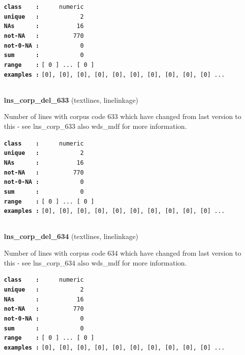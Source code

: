 \documentclass[]{article}
\begin{document}
\textbf{\texttt{class\ \ \ \ :}} \texttt{~~~~~numeric}\\
\textbf{\texttt{unique\ \ \ :}} \texttt{~~~~~~~~~~~2}\\
\textbf{\texttt{NAs\ \ \ \ \ \ :}} \texttt{~~~~~~~~~~16}\\
\textbf{\texttt{not-NA\ \ \ :}} \texttt{~~~~~~~~~770}\\
\textbf{\texttt{not-0-NA\ :}} \texttt{~~~~~~~~~~~0}\\
\textbf{\texttt{sum\ \ \ \ \ \ :}} \texttt{~~~~~~~~~~~0}\\
\textbf{\texttt{range\ \ \ \ :}}
\texttt{{[}\ 0\ {]}\ ...\ {[}\ 0\ {]}}\\
\textbf{\texttt{examples\ :}}
\texttt{{[}0{]},\ {[}0{]},\ {[}0{]},\ {[}0{]},\ {[}0{]},\ {[}0{]},\ {[}0{]},\ {[}0{]},\ {[}0{]},\ {[}0{]}\ ...}\\

~

\textbf{lns\_corp\_del\_633} (textlines, linelinkage)

Number of lines with corpus code 633 which have changed from last
version to this - see lns\_corp\_633 also wds\_mdf for more information.

\textbf{\texttt{class\ \ \ \ :}} \texttt{~~~~~numeric}\\
\textbf{\texttt{unique\ \ \ :}} \texttt{~~~~~~~~~~~2}\\
\textbf{\texttt{NAs\ \ \ \ \ \ :}} \texttt{~~~~~~~~~~16}\\
\textbf{\texttt{not-NA\ \ \ :}} \texttt{~~~~~~~~~770}\\
\textbf{\texttt{not-0-NA\ :}} \texttt{~~~~~~~~~~~0}\\
\textbf{\texttt{sum\ \ \ \ \ \ :}} \texttt{~~~~~~~~~~~0}\\
\textbf{\texttt{range\ \ \ \ :}}
\texttt{{[}\ 0\ {]}\ ...\ {[}\ 0\ {]}}\\
\textbf{\texttt{examples\ :}}
\texttt{{[}0{]},\ {[}0{]},\ {[}0{]},\ {[}0{]},\ {[}0{]},\ {[}0{]},\ {[}0{]},\ {[}0{]},\ {[}0{]},\ {[}0{]}\ ...}\\

~

\textbf{lns\_corp\_del\_634} (textlines, linelinkage)

Number of lines with corpus code 634 which have changed from last
version to this - see lns\_corp\_634 also wds\_mdf for more information.

\textbf{\texttt{class\ \ \ \ :}} \texttt{~~~~~numeric}\\
\textbf{\texttt{unique\ \ \ :}} \texttt{~~~~~~~~~~~2}\\
\textbf{\texttt{NAs\ \ \ \ \ \ :}} \texttt{~~~~~~~~~~16}\\
\textbf{\texttt{not-NA\ \ \ :}} \texttt{~~~~~~~~~770}\\
\textbf{\texttt{not-0-NA\ :}} \texttt{~~~~~~~~~~~0}\\
\textbf{\texttt{sum\ \ \ \ \ \ :}} \texttt{~~~~~~~~~~~0}\\
\textbf{\texttt{range\ \ \ \ :}}
\texttt{{[}\ 0\ {]}\ ...\ {[}\ 0\ {]}}\\
\textbf{\texttt{examples\ :}}
\texttt{{[}0{]},\ {[}0{]},\ {[}0{]},\ {[}0{]},\ {[}0{]},\ {[}0{]},\ {[}0{]},\ {[}0{]},\ {[}0{]},\ {[}0{]}\ ...}\\
\end{document}
